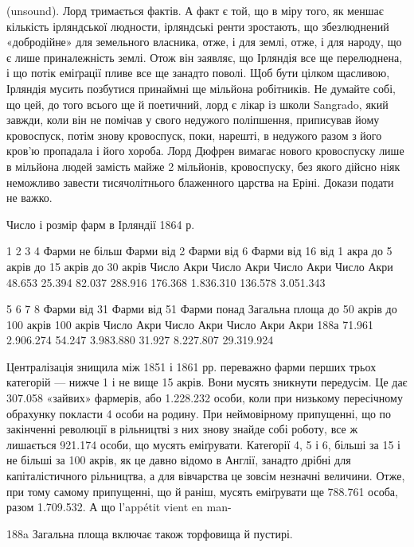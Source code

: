 (unsound). Лорд тримається фактів. А факт є той, що в міру того,
як меншає кількість ірляндської людности, ірляндські ренти
зростають, що збезлюднений «добродійне» для земельного власника,
отже, і для землі, отже, і для народу, що є лише приналежність
землі. Отож він заявляє, що Ірляндія все ще перелюднена,
і що потік еміґрації пливе все ще занадто поволі. Щоб бути цілком
щасливою, Ірляндія мусить позбутися принаймні ще  мільйона
робітників. Не думайте собі, що цей, до того всього ще й
поетичний, лорд є лікар із школи Sangrado, який завжди, коли
він не помічав у свого недужого поліпшення, приписував йому
кровоспуск, потім знову кровоспуск, поки, нарешті, в недужого
разом з його кров’ю пропадала і його хороба. Лорд Дюфрен
вимагає нового кровоспуску лише в  мільйона людей
замість майже 2 мільйонів, кровоспуску, без якого дійсно ніяк
неможливо завести тисячолітнього блаженного царства на Еріні.
Докази подати не важко.

Число і розмір фарм в Ірляндії 1864 р.

             1                                2                           3                         
               4
Фарми не більш        Фарми  від 2      Фарми від 6                 Фарми від 16
      від 1 акра                 до 5 акрів          до 15 акрів                   до 30 акрів
Число      Акри           Число    Акри      Число     Акри             Число      Акри
 48.653    25.394          82.037  288.916    176.368   1.836.310  136.578   3.051.343

          5                                   6                                7                    
              8
Фарми від 31              Фарми від 51              Фарми понад           Загальна площа
   до 50 акрів                   до 100 акрів               100 акрів
Число    Акри               Число    Акри              Число   Акри                 Акри 188а
71.961  2.906.274          54.247   3.983.880       31.927 8.227.807              29.319.924

Централізація знищила між 1851 і 1861 рр. переважно фарми
перших трьох категорій — нижче 1 і не вище 15 акрів. Вони
мусять зникнути передусім. Це дає 307.058 «зайвих» фармерів,
або 1.228.232 особи, коли при низькому пересічному обрахунку
покласти 4 особи на родину. При неймовірному припущенні, що
по закінченні революції в рільництві  з них знову знайде собі
роботу, все ж лишається 921.174 особи, що мусять еміґрувати. Категорії
4, 5 і 6, більші за 15 і не більші за 100 акрів, як це давно
відомо в Англії, занадто дрібні для капіталістичного рільництва,
а для вівчарства це зовсім незначні величини. Отже, при
тому самому припущенні, що й раніш, мусять еміґрувати ще
788.761 особа, разом 1.709.532. А що l’appétit vient en man-

188a Загальна площа включає також торфовища й пустирі.
